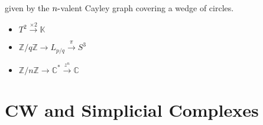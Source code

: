 \begin{fact}

\begin{center}
\end{center}

\begin{center}
\end{center}

\begin{center}
\end{center}

\begin{center}
\end{center}

given by the \(n{\hbox{-}}\)valent Cayley graph covering a wedge of
circles.

\begin{itemize}
\tightlist
\item
  \(T^2 \xrightarrow{\times 2} {\mathbb{K}}\)
\item
  \({\mathbb{Z}}/q{\mathbb{Z}}\to L_{p/q} \xrightarrow{\pi} S^3\)
\item
  \({\mathbb{Z}}/n{\mathbb{Z}}\to {\mathbb{C}}^* \xrightarrow{z^n} {\mathbb{C}}\)
\end{itemize}

\end{fact}

\hypertarget{cw-and-simplicial-complexes}{%
\section{CW and Simplicial
Complexes}\label{cw-and-simplicial-complexes}}

